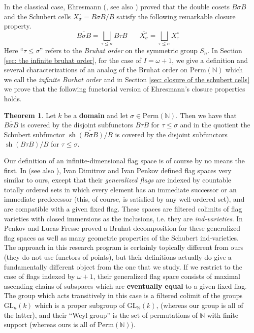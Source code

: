\documentclass[oneside,11pt]{amsart}
\newcommand{\nn}{\ensuremath{\mathbb{N}}}
\newcommand{\GL}{\ensuremath{\text{GL}}}
\newcommand{\Perm}{\ensuremath{\text{Perm}}}
\newcommand{\sh}{\operatorname{sh}}
\theoremstyle{definition}
\newtheorem{proof techniques}{Proof Techniques}
\newtheorem*{theorem*}{Theorem}
\begin{document}
In the classical case, Ehresmann (\cite{ehresmann1934}, see also \cite{chevalley1994}) proved that the double cosets $B \sigma B$ and the Schubert cells $X_\sigma^\circ = B \sigma B / B$ satisfy the following remarkable closure property. 
\begin{equation}\label{eq: closure of a schubert cell}
\overline{B \sigma B} = \bigsqcup_{\tau \leq \sigma} B \tau B \ \ \ \ \ \ \ \ \overline{ X_\sigma^\circ } = \bigsqcup_{\tau \leq \sigma} X_\tau^\circ
\end{equation}
Here ``$\tau \leq \sigma$'' refers to the \emph{Bruhat order} on the symmetric group $S_n$. In Section \ref{sec: the infinite bruhat order}, for the case of $I = \omega + 1$, we give a definition and several characterizations of an analog of the Bruhat order on $\Perm(\nn)$ which we call the \emph{infinite Burhat order} and in Section \ref{sec: closure of the schubert cells} we prove that the following functorial version of Ehresmann's closure properties holds. 

\begin{theorem*}
Let $k$ be a \textbf{domain} and let $\sigma \in \Perm(\nn)$. Then we have that $\overline{B \sigma B}$ is covered by the disjoint subfunctors $B \tau B$ for $\tau \leq \sigma$ and in the quotient the Schubert subfunctor $\overline{\sh(B \sigma B) / B}$ is covered by the disjoint subfunctors $\sh(B \tau B) / B$ for $\tau \leq \sigma$. 
\end{theorem*}



Our definition of an infinite-dimensional flag space is of course by no means the first. In \cite{dimitrov-penkov2004} (see also \cite{ignatyev-penkov2017}), Ivan Dimitrov and Ivan Penkov defined flag spaces very similar to ours, except that their \emph{generalized flags} are indexed by countable totally ordered sets in which every element has an immediate successor or an immediate predecessor (this, of course, is satisfied by any well-ordered set), and are compatible with a given fixed flag. These spaces are filtered colimits of flag varieties with closed immersions as the inclusions, i.e. they are \emph{ind-varieties}. In \cite{fresse-penkov2015} Penkov and Lucas Fresse proved a Bruhat decomposition for these generalized flag spaces as well as many geometric properties of the Schubert ind-varieties. The approach in this research program is certainly topically different from ours (they do not use functors of points), but their definitions actually do give a fundamentally different object from the one that we study. If we restrict to the case of flags indexed by $\omega + 1$, their generalized flag space consists of maximal ascending chains of subspaces which are \textbf{eventually equal} to a given fixed flag. The group which acts transitively in this case is a filtered colimit of the groups $\GL_n(k)$ which is a proper subgroup of $\GL_\nn(k)$, (whereas our group is all of the latter), and their ``Weyl group'' is the set of permutations of $\nn$ with finite support (whereas ours is all of $\Perm(\nn)$). 
\end{document}
